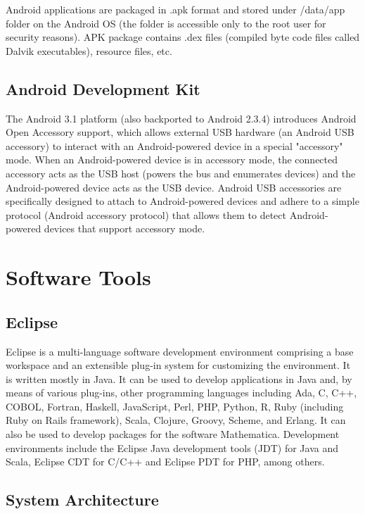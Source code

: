 	Android applications are packaged in .apk format and stored under /data/app folder on the Android OS (the folder is accessible only to the root user for security reasons). APK package contains .dex files (compiled byte code files called Dalvik executables), resource files, etc.
	
	\subsection{Android Development Kit}
	
	
		The Android 3.1 platform (also backported to Android 2.3.4) introduces Android Open Accessory support, which allows external USB hardware (an Android USB accessory) to interact with an Android-powered device in a special "accessory" mode. When an Android-powered device is in accessory mode, the connected accessory acts as the USB host (powers the bus and enumerates devices) and the Android-powered device acts as the USB device. Android USB accessories are specifically designed to attach to Android-powered devices and adhere to a simple protocol (Android accessory protocol) that allows them to detect Android-powered devices that support accessory mode.
	
	
	
	
	\section{Software Tools}
	
	\subsection{Eclipse}
		Eclipse is a multi-language software development environment comprising a base workspace and an extensible plug-in system for customizing the environment. It is written mostly in Java. It can be used to develop applications in Java and, by means of various plug-ins, other programming languages including Ada, C, C++, COBOL, Fortran, Haskell, JavaScript, Perl, PHP, Python, R, Ruby (including Ruby on Rails framework), Scala, Clojure, Groovy, Scheme, and Erlang. It can also be used to develop packages for the software Mathematica. Development environments include the Eclipse Java development tools (JDT) for Java and Scala, Eclipse CDT for C/C++ and Eclipse PDT for PHP, among others.
	
	
	\subsection{System Architecture}
	
